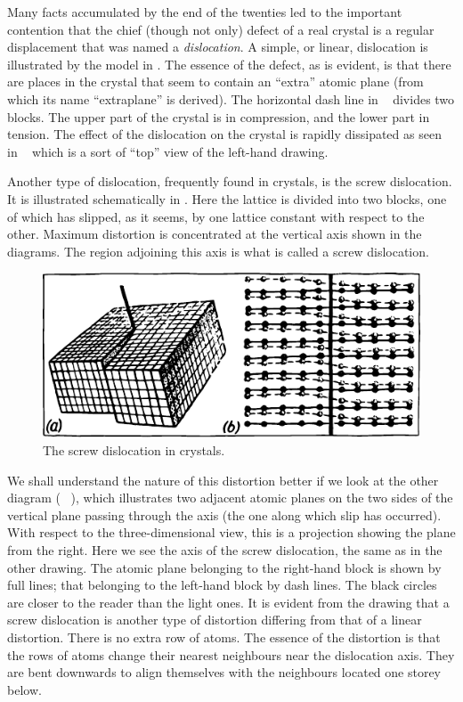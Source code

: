 Many facts accumulated by the end of the twenties led to the important contention that the chief (though not only) defect of a real crystal is a regular displacement that was named a \emph{dislocation}. A simple, or linear, dislocation is illustrated by the model in . The essence of the defect, as is evident, is that there are places in the crystal that seem to contain an ``extra'' atomic plane (from which its name ``extraplane'' is derived). The horizontal dash line in ~ divides two blocks. The upper part of the crystal is in compression, and the lower part in tension. The effect of the dislocation on the crystal is rapidly dissipated as seen in ~ which is a sort of ``top'' view of the left-hand drawing. 

Another type of dislocation, frequently found in crystals, is the screw dislocation. It is illustrated schemati­cally in . Here the lattice is divided into two blocks, one of which has slipped, as it seems, by one lattice constant with respect to the other. Maximum distortion is concentrated at the vertical axis shown in the diagrams. The region adjoining this axis is what is called a screw dislocation.
\begin{figure}[!ht]
\centering
\includegraphics[width=\textwidth]{figures/fig-06-07.pdf}
\caption{The screw dislocation in crystals.}
\label{fig-6.7}
\end{figure}

We shall understand the nature of this distortion better if we look at the other diagram ( ~), which illus­trates two adjacent atomic planes on the two sides of the vertical plane passing through the axis (the one along which slip has occurred). With respect to the three-dimensional view, this is a projection showing the plane from the right. Here we see the axis of the screw disloca­tion, the same as in the other drawing. The atomic plane belonging to the right-hand block is shown by full lines; that belonging to the left-hand block by dash lines. The black circles are closer to the reader than the light ones. It is evident from the drawing that a screw dislocation is another type of distortion differing from that of a linear distortion. There is no extra row of atoms. The essence of the distortion is that the rows of atoms change their nearest neighbours near the dislocation axis. They are bent downwards to align themselves with the neighbours located one storey below.

